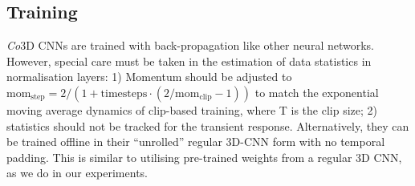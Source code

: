 \vspace{-2mm}
\subsection{Training}
\textit{Co}3D CNNs are trained with back-propagation like other neural networks. However, special care must be taken in the estimation of data statistics in normalisation layers: 1) Momentum should be adjusted to $\text{mom}_\text{step} = 2 / (1 + \text{timesteps}\cdot(2 / \text{mom}_\text{clip} - 1))$ to match the exponential moving average dynamics of clip-based training, where T is the clip size; 2) statistics should not be tracked for the transient response.
Alternatively, they can be trained offline in their ``unrolled'' regular 3D-CNN form with no temporal padding. %
This is similar to utilising pre-trained weights from a regular 3D CNN, as we do in our experiments.


